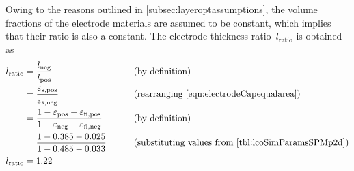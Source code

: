 Owing to the reasons  outlined in \cref{subsec:layeroptassumptions}, the
volume fractions of the electrode  materials are assumed to be constant,
which  implies  that their  ratio  is  also  a constant.  The  electrode
thickness ratio~$l_\text{ratio}$ is obtained as
\begin{alignat}{2}
    l_\text{ratio} & = \frac{l_\text{neg}}{l_\text{pos}}                                                                                  &  & \qquad\text{(by definition)}                                          \\
    {}             & = \frac{\varepsilon_\text{s,pos}}{\varepsilon_\text{s,neg}}                                                          &  & \qquad\text{(rearranging \cref{eqn:electrodeCapequalarea})}           \\
    {}             & = \frac{1-\varepsilon_\text{pos} - \varepsilon_\text{fi,pos}}{1-\varepsilon_\text{neg} - \varepsilon_\text{fi,neg}}  &  & \qquad\text{(by definition)}                                          \\
    {}             & = \frac{1- 0.385 - 0.025}{1 - 0.485 - 0.033}                                                                         &  & \qquad\text{(substituting values from \cref{tbl:lcoSimParamsSPMp2d})} \\
    l_\text{ratio} & = 1.22\label{eqn:electrodeThicknessRatio}
\end{alignat}

